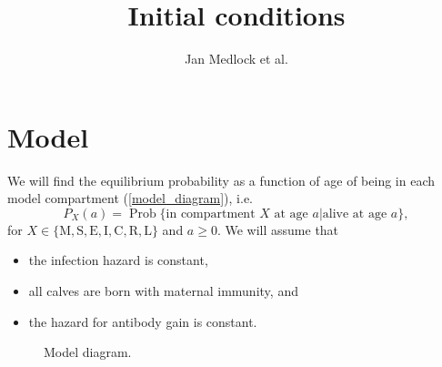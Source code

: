 \documentclass[12pt]{article}
\title{Initial conditions}
\author{Jan Medlock et al.}
\DeclareMathOperator{\Prob}{Prob}
\begin{document}
\maketitle

\section{Model}

We will find the equilibrium probability as a function of age of being
in each model compartment (\autoref{model_diagram}), i.e.
\begin{equation}
  P_X(a) = \Prob\{\text{in compartment $X$ at age $a$}|\text{alive at
    age $a$}\},
\end{equation}
for $X \in \{\mathrm{M}, \mathrm{S}, \mathrm{E}, \mathrm{I},
\mathrm{C}, \mathrm{R}, \mathrm{L}\}$
and $a \geq 0$.
We will assume that
\begin{itemize}
\item the infection hazard is constant,
\item all calves are born with maternal immunity, and
\item the hazard for antibody gain is constant.
\end{itemize}

\begin{figure}
  \begin{center}
    
  \end{center}
  \caption{Model diagram.}
  \label{model_diagram}
\end{figure}

\clearpage
\end{document}
